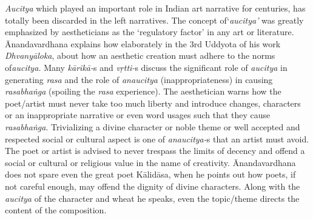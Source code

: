 \textit{Aucitya} which played an important role in Indian art narrative for centuries, has totally been discarded in the left narratives. The concept of‘\textit{aucitya’} was greatly emphasized by aestheticians as the ‘regulatory factor’ in any art or literature. Ānandavardhana explains how elaborately in the 3rd Uddyota of his work \textit{Dhvanyāloka}, about how an aesthetic creation must adhere to the norms of\textit{aucitya.} Many \textit{kārikā-}s and \textit{vṛtti-}s discuss the significant role of \textit{aucitya} in generating \textit{rasa} and the role of \textit{anaucitya} (inappropriateness) in causing \textit{rasabhaṅga} (spoiling the \textit{rasa} experience). The aesthetician warns how the poet/artist must never take too much liberty and introduce changes, characters or an inappropriate narrative or even word usages such that they cause \textit{rasabhaṅga}. Trivializing a divine character or noble theme or well accepted and respected social or cultural aspect is one of \textit{anaucitya-}s that an artist must avoid. The poet or artist is advised to never trespass the limits of decency and offend a social or cultural or religious value in the name of creativity. Ānandavardhana does not spare even the great poet Kālidāsa, when he points out how poets, if not careful enough, may offend the dignity of divine characters. Along with the \textit{aucitya} of the character and wheat he speaks, even the topic/theme directs the content of the composition.

